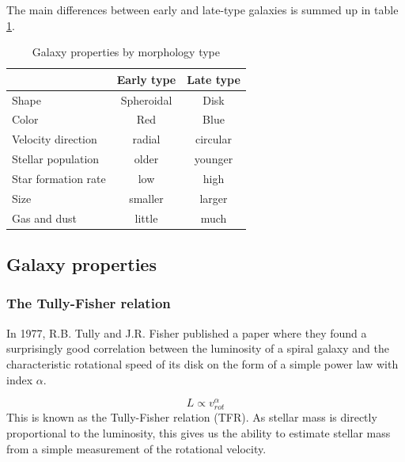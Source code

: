 The main differences between early and late-type galaxies is summed up in table \ref{morphologies}.

\begin{table}
\begin{center}
\begin{tabular} { l| c c } 
 \hline
 \hline
  & Early type & Late type \\
 \hline
 Shape & Spheroidal & Disk \\
 Color & Red & Blue \\
 Velocity direction& radial & circular \\
 Stellar population & older & younger \\
 Star formation rate & low & high \\
 Size & smaller & larger \\
 Gas and dust & little & much \\
  
 \hline 
\end{tabular}
\end{center}
\caption{Galaxy properties by morphology type}
\label{morphologies}
\end{table}

\subsection{Galaxy properties}


\subsubsection{The Tully-Fisher relation}

In 1977, R.B. Tully and J.R. Fisher \parencite{TullyFisher1977} published a paper where they found a surprisingly good correlation between the luminosity of a spiral galaxy and the characteristic rotational speed of its disk on the form of a simple power law with index $\alpha$.

\begin{equation}
    L \propto v_{rot}^\alpha
\end{equation}
This is known as the Tully-Fisher relation (TFR). As stellar mass is directly proportional to the luminosity, this gives us the ability to estimate stellar mass from a simple measurement of the rotational velocity.

